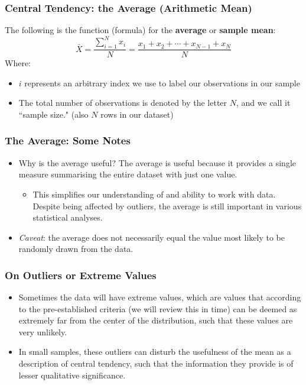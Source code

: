 \documentclass[handout]{beamer} %
\begin{document}
\begin{frame}
\frametitle{Central Tendency: the Average (Arithmetic Mean)}
The following is the function (formula) for the \textbf{average} or \textbf{sample mean}:
\begin{equation*}
\bar{X} = \frac{\sum_{i=1}^{N} x_i}{N} = \frac{x_1 + x_2 + \cdots + x_{N-1} + x_{N}}{N}
\end{equation*}
Where:
\begin{itemize}
    \item $i$ represents an arbitrary index we use to label our observations in our sample
    \item The total number of observations is denoted by the letter $N$, and we call it ``sample size." (also $N$ rows in our dataset)
\end{itemize}
\end{frame}

\begin{frame}
\frametitle{The Average: Some Notes}
\begin{itemize}
\item Why is the average useful? The average is useful because it provides a single measure summarising the entire dataset with just one value.
\begin{itemize}
    \item This simplifies our understanding of and ability to work with data. Despite being affected by outliers, the average is still important in various statistical analyses.
\end{itemize}
\item \emph{Caveat}: the average does not necessarily equal the value most likely to be randomly drawn from the data.
\end{itemize}
\end{frame}

\begin{frame}
\frametitle{On Outliers or Extreme Values}
\begin{itemize}
\item Sometimes the data will have extreme values, which are values that according to the pre-established criteria (we will review this in time) can be deemed as extremely far from the center of the distribution, such that these values are very unlikely.
\item In small samples, these outliers can disturb the usefulness of the mean as a description of central tendency, such that the information they provide is of lesser qualitative significance.
\end{itemize}
\end{frame}
\end{document}

